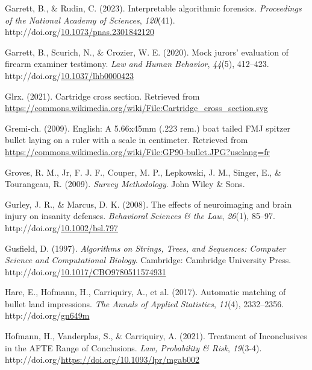 \documentclass[print]{nuthesis}
\newlength{\cslhangindent}
\newenvironment{CSLReferences}[2]%
{\setlength{\parindent}{0pt}%
\everypar{\setlength{\hangindent}{\cslhangindent}}\ignorespaces}%
{\par}
\begin{document}
\begin{CSLReferences}{1}{0}
\leavevmode{}%
Garrett, B., \& Rudin, C. (2023). Interpretable algorithmic forensics. \emph{Proceedings of the National Academy of Sciences}, \emph{120}(41). http://doi.org/\href{https://doi.org/10.1073/pnas.2301842120}{10.1073/pnas.2301842120}

\leavevmode{}%
Garrett, B., Scurich, N., \& Crozier, W. E. (2020). Mock jurors' evaluation of firearm examiner testimony. \emph{Law and Human Behavior}, \emph{44}(5), 412--423. http://doi.org/\href{https://doi.org/10.1037/lhb0000423}{10.1037/lhb0000423}

\leavevmode{}%
Glrx. (2021). Cartridge cross section. Retrieved from \url{https://commons.wikimedia.org/wiki/File:Cartridge_cross_section.svg}

\leavevmode{}%
Gremi-ch. (2009). English: {A} 5.66x45mm (.223 rem.) boat tailed {FMJ} spitzer bullet laying on a ruler with a scale in centimeter. Retrieved from \url{https://commons.wikimedia.org/wiki/File:GP90-bullet.JPG?uselang=fr}

\leavevmode{}%
Groves, R. M., Jr, F. J. F., Couper, M. P., Lepkowski, J. M., Singer, E., \& Tourangeau, R. (2009). \emph{Survey {Methodology}}. John Wiley \& Sons.

\leavevmode{}%
Gurley, J. R., \& Marcus, D. K. (2008). The effects of neuroimaging and brain injury on insanity defenses. \emph{Behavioral Sciences \& the Law}, \emph{26}(1), 85--97. http://doi.org/\href{https://doi.org/10.1002/bsl.797}{10.1002/bsl.797}

\leavevmode{}%
Gusfield, D. (1997). \emph{Algorithms on {Strings}, {Trees}, and {Sequences}: {Computer} {Science} and {Computational} {Biology}}. Cambridge: Cambridge University Press. http://doi.org/\href{https://doi.org/10.1017/CBO9780511574931}{10.1017/CBO9780511574931}

\leavevmode{}%
Hare, E., Hofmann, H., Carriquiry, A., et al. (2017). Automatic matching of bullet land impressions. \emph{The Annals of Applied Statistics}, \emph{11}(4), 2332--2356. http://doi.org/\href{https://doi.org/gn649m}{gn649m}

\leavevmode{}%
Hofmann, H., Vanderplas, S., \& Carriquiry, A. (2021). Treatment of {Inconclusives} in the {AFTE} {Range} of {Conclusions}. \emph{Law, Probability \& Risk}, \emph{19}(3-4). http://doi.org/\url{https://doi.org/10.1093/lpr/mgab002}


\end{CSLReferences}
\end{document}
